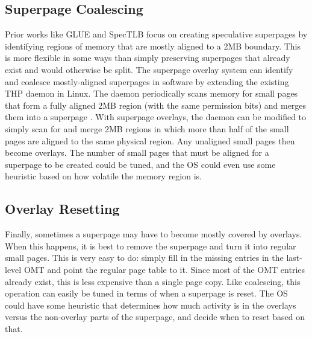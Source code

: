 \subsection{Superpage Coalescing}
Prior works like GLUE \cite{Pham} and SpecTLB \cite{Barr} focus on creating speculative superpages by identifying regions of memory that are mostly aligned to a 2MB boundary. This is more flexible in some ways than simply preserving superpages that already exist and would otherwise be split. The superpage overlay system can identify and coalesce mostly-aligned superpages in software by extending the existing THP daemon in Linux. The daemon periodically scans memory for small pages that form a fully aligned 2MB region (with the same permission bits) and merges them into a superpage \cite{THP}. With superpage overlays, the daemon can be modified to simply scan for and merge 2MB regions in which more than half of the small pages are aligned to the same physical region. Any unaligned small pages then become overlays. The number of small pages that must be aligned for a superpage to be created could be tuned, and the OS could even use some heuristic based on how volatile the memory region is.

\subsection{Overlay Resetting}
Finally, sometimes a superpage may have to become mostly covered by overlays. When this happens, it is best to remove the superpage and turn it into regular small pages. This is very easy to do: simply fill in the missing entries in the last-level OMT and point the regular page table to it. Since most of the OMT entries already exist, this is less expensive than a single page copy. Like coalescing, this operation can easily be tuned in terms of when a superpage is reset. The OS could have some heuristic that determines how much activity is in the overlays versus the non-overlay parts of the superpage, and decide when to reset based on that.
